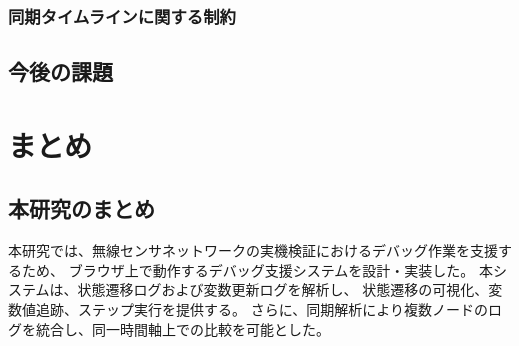 \documentclass[12pt]{jreport}
\begin{document}
\subsection{同期タイムラインに関する制約}

\section{今後の課題}




\chapter{まとめ}

\section{本研究のまとめ}
\begin{par}
本研究では、無線センサネットワークの実機検証におけるデバッグ作業を支援するため、
ブラウザ上で動作するデバッグ支援システムを設計・実装した。
本システムは、状態遷移ログおよび変数更新ログを解析し、
状態遷移の可視化、変数値追跡、ステップ実行を提供する。
さらに、同期解析により複数ノードのログを統合し、同一時間軸上での比較を可能とした。
\end{par}
\end{document}
